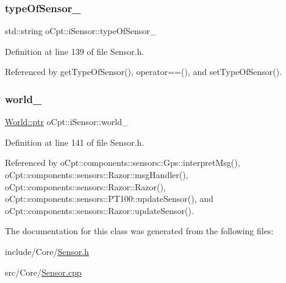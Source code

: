 \subsubsection{\texorpdfstring{type\+Of\+Sensor\+\_\+}{typeOfSensor\_}}
{\footnotesize\ttfamily std\+::string o\+Cpt\+::i\+Sensor\+::type\+Of\+Sensor\+\_\+\hspace{0.3cm}{\ttfamily [protected]}}



Definition at line 139 of file Sensor.\+h.



Referenced by get\+Type\+Of\+Sensor(), operator==(), and set\+Type\+Of\+Sensor().

\hypertarget{classo_cpt_1_1i_sensor_aab033b6462d7e8710c006f19c51e033e}{}\label{classo_cpt_1_1i_sensor_aab033b6462d7e8710c006f19c51e033e} 
\subsubsection{\texorpdfstring{world\+\_\+}{world\_}}
{\footnotesize\ttfamily \hyperlink{classo_cpt_1_1_world_aa6e591e3096d5de71e0cec9039663d67}{World\+::ptr} o\+Cpt\+::i\+Sensor\+::world\+\_\+\hspace{0.3cm}{\ttfamily [protected]}}



Definition at line 141 of file Sensor.\+h.



Referenced by o\+Cpt\+::components\+::sensors\+::\+Gps\+::interpret\+Msg(), o\+Cpt\+::components\+::sensors\+::\+Razor\+::msg\+Handler(), o\+Cpt\+::components\+::sensors\+::\+Razor\+::\+Razor(), o\+Cpt\+::components\+::sensors\+::\+P\+T100\+::update\+Sensor(), and o\+Cpt\+::components\+::sensors\+::\+Razor\+::update\+Sensor().



The documentation for this class was generated from the following files\+:\begin{DoxyCompactItemize}
\item 
include/\+Core/\hyperlink{_sensor_8h}{Sensor.\+h}\item 
src/\+Core/\hyperlink{_sensor_8cpp}{Sensor.\+cpp}\end{DoxyCompactItemize}

